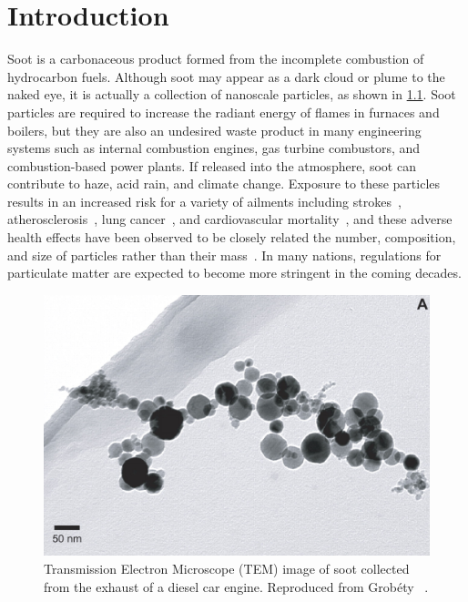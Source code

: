 \chapter{Introduction\label{ch:intro}}
 
Soot is a carbonaceous product formed from the incomplete combustion of hydrocarbon fuels. Although soot may appear as a dark cloud or plume to the naked eye, it is actually a collection of nanoscale particles, as shown in \cref{fig:intro:dieselsoot}. Soot particles are required to increase the radiant energy of flames in furnaces and boilers, but they are also an undesired waste product in many engineering systems such as internal combustion engines, gas turbine combustors, and combustion-based power plants. If released into the atmosphere, soot can contribute to haze, acid rain, and climate change. Exposure to these particles results in an increased risk for a variety of ailments including strokes~\cite{popeiii2006}, atherosclerosis~\cite{polichetti2009,kennedy2007,popeiii2006}, lung cancer~\cite{kennedy2007,popeiii2006}, and cardiovascular mortality~\cite{polichetti2009,kennedy2007,popeiii2006}, and these adverse health effects have been observed to be closely related the number, composition, and size of particles rather than their mass~\cite{seaton1995,lighty2000}. In many nations, regulations for particulate matter are expected to become more stringent in the coming decades.

\begin{figure}[htb]
  \centering
  \includegraphics[width=0.4\linewidth]{ch-intro/figures/diesel-soot}
  \caption[Soot From a Diesel Car Engine]{Transmission Electron Microscope (TEM) image of soot collected from the exhaust of a diesel car engine. Reproduced from Grob\'ety \etal~\cite{grobety2010}.}
  \label{fig:intro:dieselsoot}
\end{figure}


